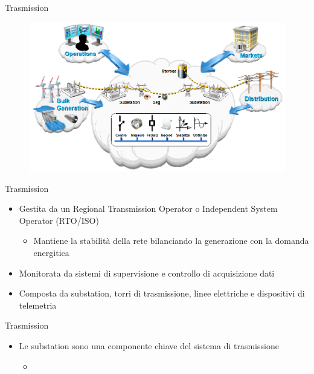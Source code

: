
\begin{frame}[fragile]{Trasmission}
	\begin{figure}[h] 
		\includegraphics[scale=0.45]{imgs/tras.png}
	\end{figure}
\end{frame}

\begin{frame}[fragile]{Trasmission}
	\begin{itemize}[<+- | alert@+>]
		\item Gestita da un Regional Transmission Operator o Independent System Operator (RTO/ISO)
			\begin{itemize}
				\item Mantiene la stabilità della rete bilanciando la generazione con la domanda energitica
			\end{itemize}				
		\item Monitorata da sistemi di supervisione e controllo di acquisizione dati
		\item Composta da substation, torri di trasmissione, linee elettriche e dispositivi di telemetria	 
	\end{itemize}
\end{frame}

\begin{frame}[fragile]{Trasmission}
	\begin{itemize}[<+- | alert@+>]
		\item Le substation sono una componente chiave del sistema di trasmissione
		\begin{itemize}
			\item 
		\end{itemize}
	\end{itemize}
\end{frame}

